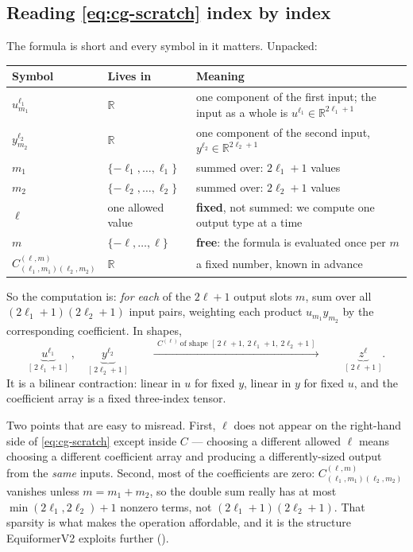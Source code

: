 \documentclass[11pt,a4paper]{report}
\theoremstyle{definition}
\theoremstyle{remark}
\newcommand{\RR}{\mathbb R}
\begin{document}
\subsection{Reading \eqref{eq:cg-scratch} index by index}
\label{sec:cg-index-by-index}

The formula is short and every symbol in it matters. Unpacked:

\begin{center}
\begin{tabular}{llp{6.4cm}}
\toprule
Symbol & Lives in & Meaning \\
\midrule
$u^{\ell_1}_{m_1}$ & $\RR$ & one component of the first input; the input as a whole is $u^{\ell_1}\in\RR^{2\ell_1+1}$ \\
$y^{\ell_2}_{m_2}$ & $\RR$ & one component of the second input, $y^{\ell_2}\in\RR^{2\ell_2+1}$ \\
$m_1$ & $\{-\ell_1,\dots,\ell_1\}$ & summed over: $2\ell_1+1$ values \\
$m_2$ & $\{-\ell_2,\dots,\ell_2\}$ & summed over: $2\ell_2+1$ values \\
$\ell$ & one allowed value & \textbf{fixed}, not summed: we compute one output type at a time \\
$m$ & $\{-\ell,\dots,\ell\}$ & \textbf{free}: the formula is evaluated once per $m$ \\
$C^{(\ell,m)}_{(\ell_1,m_1)(\ell_2,m_2)}$ & $\RR$ & a fixed number, known in advance \\
\bottomrule
\end{tabular}
\end{center}

So the computation is: \emph{for each} of the $2\ell+1$ output slots $m$,
sum over all $(2\ell_1+1)(2\ell_2+1)$ input pairs, weighting each product
$u_{m_1}y_{m_2}$ by the corresponding coefficient. In shapes,
\[
\underbrace{u^{\ell_1}}_{[\,2\ell_1+1\,]}
\ ,\quad
\underbrace{y^{\ell_2}}_{[\,2\ell_2+1\,]}
\qquad\xrightarrow{\ \ C^{(\ell)}\ \text{of shape } [\,2\ell+1,\ 2\ell_1+1,\ 2\ell_2+1\,]\ \ }\qquad
\underbrace{z^{\ell}}_{[\,2\ell+1\,]} .
\]
It is a bilinear contraction: linear in $u$ for fixed $y$, linear in $y$ for
fixed $u$, and the coefficient array is a fixed three-index tensor.

Two points that are easy to misread. First, $\ell$ does not appear on the
right-hand side of \eqref{eq:cg-scratch} except inside $C$ --- choosing a
different allowed $\ell$ means choosing a different coefficient array and
producing a differently-sized output from the \emph{same} inputs. Second,
most of the coefficients are zero: $C^{(\ell,m)}_{(\ell_1,m_1)(\ell_2,m_2)}$
vanishes unless $m=m_1+m_2$, so the double sum really has at most
$\min(2\ell_1,2\ell_2)+1$ nonzero terms, not $(2\ell_1+1)(2\ell_2+1)$. That
sparsity is what makes the operation affordable, and it is the structure
EquiformerV2 exploits further ().
\end{document}
